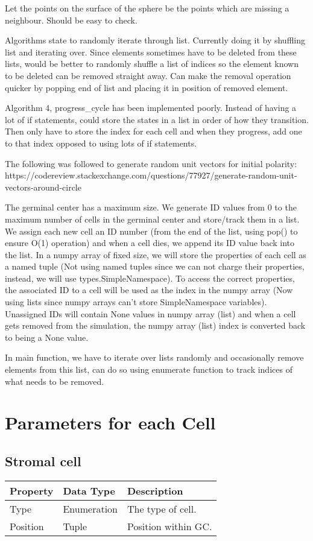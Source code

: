 \documentclass[english]{article}
\begin{document}
Let the points on the surface of the sphere be the points which are missing a neighbour. Should be easy to check.

Algorithms state to randomly iterate through list. Currently doing it by shuffling list and iterating over. Since elements sometimes have to be deleted from these lists, would be better to randomly shuffle a list of indices so the element known to be deleted can be removed straight away. Can make the removal operation quicker by popping end of list and placing it in position of removed element. 

Algorithm 4, progress\_cycle has been implemented poorly. Instead of having a lot of if statements, could store the states in a list in order of how they transition. Then only have to store the index for each cell and when they progress, add one to that index opposed to using lots of if statements. 

The following was followed to generate random unit vectors for initial polarity: https://codereview.stackexchange.com/questions/77927/generate-random-unit-vectors-around-circle

The germinal center has a maximum size. We generate ID values from 0 to the maximum number of cells in the germinal center and store/track them in a list. We assign each new cell an ID number (from the end of the list, using pop() to ensure O(1) operation) and when a cell dies, we append its ID value back into the list. In a numpy array of fixed size, we will store the properties of each cell as a named tuple (Not using named tuples since we can not charge their properties, instead, we will use types.SimpleNamespace). To access the correct properties, the associated ID to a cell will be used as the index in the numpy array (Now using lists since numpy arrays can't store SimpleNamespace variables). Unassigned IDs will contain None values in numpy array (list) and when a cell gets removed from the simulation, the numpy array (list) index is converted back to being a None value. 

In main function, we have to iterate over lists randomly and occasionally remove elements from this list, can do so using enumerate function to track indices of what needs to be removed. 



\section{Parameters for each Cell}

\subsection{Stromal cell}
\begin{center}
\begin{tabular}{|C{2.1in}|C{2.1in}|C{2.1in}|}
\hline
\textbf{Property} & \textbf{Data Type} & \textbf{Description}
\tabularnewline
\hline
\hline
Type & Enumeration & The type of cell. 
\tabularnewline
\hline
Position & Tuple & Position within GC.
\tabularnewline
\hline

\end{tabular}
\end{center}
\end{document}
